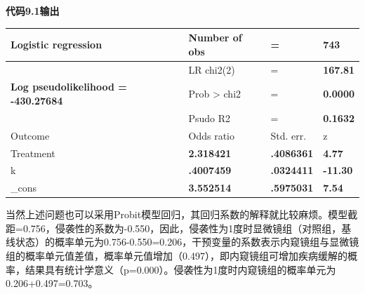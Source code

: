 \documentclass[
  chinese-hans,
  letterpaper,
  DIV=11,
  numbers=noendperiod]{scrreprt}
\newcounter{none} %
\begin{document}
\begin{tcolorbox}[enhanced jigsaw, arc=.35mm, bottomrule=.15mm, breakable, colback=white, colframe=quarto-callout-note-color-frame, left=2mm, leftrule=.75mm, opacityback=0, rightrule=.15mm, toprule=.15mm]

\vspace{-3mm}\textbf{代码9.1输出}\vspace{3mm}

{\def\LTcaptype{none} %
\begin{longtable}[]{@{}
  >{\centering\arraybackslash}p{}
  >{\raggedright\arraybackslash}p{}
  >{\centering\arraybackslash}p{}
  >{\centering\arraybackslash}p{}@{}}
\toprule\noalign{}
\begin{minipage}[b]{\linewidth}\centering
Logistic regression
\end{minipage} & \begin{minipage}[b]{\linewidth}\raggedright
Number of obs
\end{minipage} & \begin{minipage}[b]{\linewidth}\centering
=
\end{minipage} & \begin{minipage}[b]{\linewidth}\centering
\textbf{743}
\end{minipage} \\
\midrule\noalign{}
\endhead
\bottomrule\noalign{}
\endlastfoot
& LR chi2(2) & = & \textbf{167.81} \\
\textbf{Log pseudolikelihood = -430.27684} & Prob \textgreater{} chi2 &
= & \textbf{0.0000} \\
& Psudo R2 & = & \textbf{0.1632} \\
Outcome & Odds ratio & Std. err. & z \\
Treatment & \textbf{2.318421} & \textbf{.4086361} & \textbf{4.77} \\
k & \textbf{.4007459} & \textbf{.0324411} & \textbf{-11.30} \\
\_cons & \textbf{3.552514} & \textbf{.5975031} & \textbf{7.54} \\
\end{longtable}
}

\end{tcolorbox}

当然上述问题也可以采用Probit模型回归，其回归系数的解释就比较麻烦。模型截距=0.756，侵袭性的系数为-0.550，因此，侵袭性为1度时显微镜组（对照组，基线状态）的概率单元为0.756-0.550=0.206，干预变量的系数表示内窥镜组与显微镜组的概率单元值差值，概率单元值增加（0.497），即内窥镜组可增加疾病缓解的概率，结果具有统计学意义（p=0.000）。侵袭性为1度时内窥镜组的概率单元为0.206+0.497=0.703。
\end{document}

